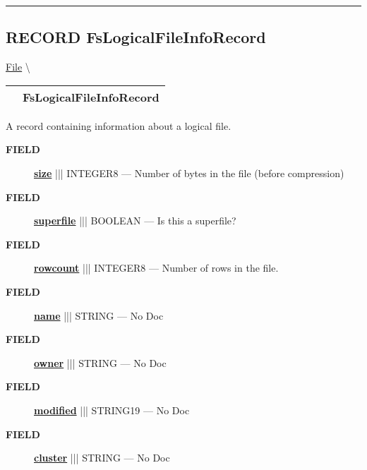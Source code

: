 \rule{\linewidth}{0.5pt}
\subsection*{\textsf{\colorbox{headtoc}{\color{white} RECORD}
FsLogicalFileInfoRecord}}

\hypertarget{ecldoc:file.fslogicalfileinforecord}{}
\hspace{0pt} \hyperlink{ecldoc:File}{File} \textbackslash 

{\renewcommand{\arraystretch}{1.5}
\begin{tabularx}{\textwidth}{|>{\raggedright\arraybackslash}l|X|}
\hline
\hspace{0pt}\mytexttt{\color{red} } & \textbf{FsLogicalFileInfoRecord} \\
\hline
\end{tabularx}
}

\par





A record containing information about a logical file.







\par
\begin{description}
\item [\colorbox{tagtype}{\color{white} \textbf{\textsf{FIELD}}}] \textbf{\underline{size}} ||| INTEGER8 --- Number of bytes in the file (before compression)
\item [\colorbox{tagtype}{\color{white} \textbf{\textsf{FIELD}}}] \textbf{\underline{superfile}} ||| BOOLEAN --- Is this a superfile?
\item [\colorbox{tagtype}{\color{white} \textbf{\textsf{FIELD}}}] \textbf{\underline{rowcount}} ||| INTEGER8 --- Number of rows in the file.
\item [\colorbox{tagtype}{\color{white} \textbf{\textsf{FIELD}}}] \textbf{\underline{name}} ||| STRING --- No Doc
\item [\colorbox{tagtype}{\color{white} \textbf{\textsf{FIELD}}}] \textbf{\underline{owner}} ||| STRING --- No Doc
\item [\colorbox{tagtype}{\color{white} \textbf{\textsf{FIELD}}}] \textbf{\underline{modified}} ||| STRING19 --- No Doc
\item [\colorbox{tagtype}{\color{white} \textbf{\textsf{FIELD}}}] \textbf{\underline{cluster}} ||| STRING --- No Doc
\end{description}





